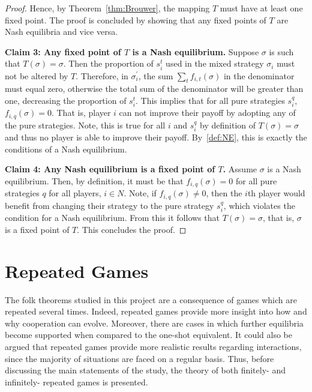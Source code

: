 \begin{proof}
    Hence, by Theorem~\ref{thm:Brouwer}, the mapping \(T\) must have at least
    one fixed point. The proof is concluded by showing that any fixed points of
    \(T\) are Nash equilibria and vice versa. 

    \textbf{Claim 3: Any fixed point of \(T\) is a Nash equilibrium.}
    Suppose \(\sigma \) is such that \(T(\sigma) = \sigma \). Then the
    proportion of \(s_{i}^{t}\) used in the mixed strategy \(\sigma_{i}\) must
    not be altered by \(T\). Therefore, in \(\sigma_{i}^{\prime}\), the sum
    \(\sum_{t}{f_{i,t}(\sigma)}\) in the denominator must equal zero, otherwise the total sum of the denominator will be greater than one,
    decreasing the proportion of \(s_{i}^{t}\). This implies that for all pure
    strategies \(s_{i}^{q}\), \(f_{i,q}(\sigma)=0\). That is, player \(i\) can not
    improve their payoff by adopting any of the pure strategies. Note, this is
    true for all \(i\) and \(s_{i}^{q}\) by definition of \(T(\sigma) = \sigma
    \) and thus no player is able to improve their payoff. By~\autoref{def:NE},
    this is exactly the conditions of a Nash equilibrium.

    \textbf{Claim 4: Any Nash equilibrium is a fixed point of \(T\).}
    Assume \(\sigma \) is a Nash equilibrium. Then, by definition, it must
    be that \(f_{i,q}(\sigma)=0\) for all pure strategies \(q\) for all players,
    \(i \in N\). Note, if \(f_{i,q}(\sigma) \ne 0\), then the
    \(i\)th player would benefit from changing their strategy to the pure
    strategy \(s_{i}^{q}\), which violates the condition for a Nash equilibrium.
    From this it follows that \(T(\sigma) = \sigma \), that is, \(\sigma \) is a
    fixed point of \(T\). This concludes the proof.
\end{proof}

\section{Repeated Games}\label{sec:Repeated_Games}
The folk theorems studied in this project are a consequence of games which are
repeated several times. Indeed, repeated games provide more
insight into how and why cooperation can evolve. Moreover, there are cases in
which further equilibria become supported when compared to the one-shot
equivalent. It could also be argued that repeated games provide more realistic
results regarding interactions, since the majority of situations are faced on a
regular basis. Thus, before discussing the
main statements of the study, the theory of both finitely- and infinitely-
repeated games is presented.

